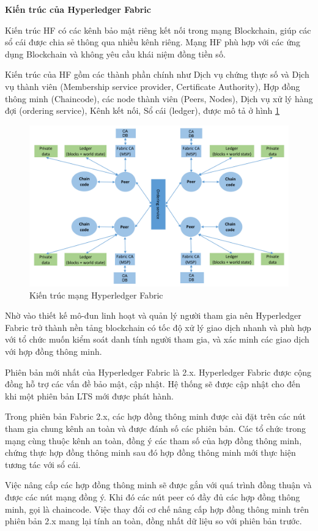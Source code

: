 \textbf{Kiến trúc của Hyperledger Fabric}

Kiến trúc HF có các kênh bảo mật riêng kết nối trong mạng Blockchain, giúp các   sổ cái được chia sẻ thông qua nhiều kênh riêng. Mạng HF phù hợp với các ứng  dụng Blockchain và không yêu cầu khái niệm đồng tiền số.

Kiến trúc của HF gồm các thành phần chính như Dịch vụ chứng thực số và Dịch vụ thành viên (Membership service provider, Certificate Authority), Hợp đồng thông minh (Chaincode), các node thành viên (Peers, Nodes), Dịch vụ xử lý hàng đợi (ordering service), Kênh kết nối, Sổ cái (ledger), được mô tả ở hình \ref{fig:hlf_arch} 
\begin{figure}[htbp]
\centering
\includegraphics[width=.9\linewidth]{img/hlf_arch.png}
\caption{Kiến trúc mạng Hyperledger Fabric}
\label{fig:hlf_arch}
\end{figure}

Nhờ vào thiết kế mô-đun linh hoạt và quản lý người tham gia nên Hyperledger Fabric trở thành nền tảng blockchain có tốc độ xử lý giao dịch nhanh và phù hợp với tổ chức muốn kiểm soát danh tính người tham gia, và xác minh các giao dịch với hợp đồng thông minh.

Phiên bản mới nhất của Hyperledger Fabric là 2.x. 
Hyperledger Fabric được cộng đồng hỗ trợ các vấn đề bảo mật, cập nhật. 
Hệ thống sẽ được cập nhật cho đến khi một phiên bản LTS mới được phát hành.

Trong phiên bản Fabric 2.x, các hợp đồng thông minh được cài đặt trên các nút tham gia chung kênh an toàn và được đánh số các phiên bản. 
Các tổ chức trong mạng cùng thuộc kênh an toàn, đồng ý các tham số của hợp đồng thông minh, chứng thực hợp đồng thông minh sau đó hợp đồng thông minh mới thực hiện tương tác với sổ cái. 

Việc nâng cấp các hợp đồng thông minh sẽ được gắn với quá trình đồng thuận và được các nút mạng đồng ý. 
Khi đó các nút peer có đầy đủ các hợp đồng thông minh, gọi là chaincode. 
Việc thay đổi cơ chế nâng cấp hợp đồng thông minh trên phiên bản 2.x mang lại tính an toàn, đồng nhất dữ liệu so với phiên bản trước.

